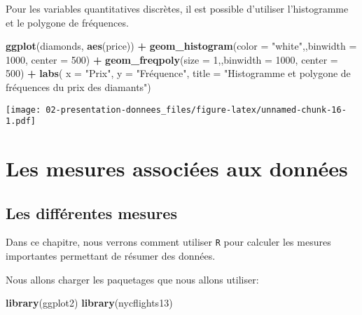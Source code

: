 \documentclass[]{book}
\newenvironment{Shaded}{\begin{snugshade}}{\end{snugshade}}
\newcommand{\KeywordTok}[1]{\textcolor[rgb]{0.13,0.29,0.53}{\textbf{#1}}}
\newcommand{\DataTypeTok}[1]{\textcolor[rgb]{0.13,0.29,0.53}{#1}}
\newcommand{\DecValTok}[1]{\textcolor[rgb]{0.00,0.00,0.81}{#1}}
\newcommand{\StringTok}[1]{\textcolor[rgb]{0.31,0.60,0.02}{#1}}
\newcommand{\OperatorTok}[1]{\textcolor[rgb]{0.81,0.36,0.00}{\textbf{#1}}}
\newcommand{\NormalTok}[1]{#1}
\begin{document}
Pour les variables quantitatives discrètes, il est possible d'utiliser
l'histogramme et le polygone de fréquences.

\begin{Shaded}
\begin{Highlighting}[]
\KeywordTok{ggplot}\NormalTok{(diamonds, }\KeywordTok{aes}\NormalTok{(price)) }\OperatorTok{+}\StringTok{ }
\StringTok{  }\KeywordTok{geom_histogram}\NormalTok{(}\DataTypeTok{color =} \StringTok{"white"}\NormalTok{,,}\DataTypeTok{binwidth =} \DecValTok{1000}\NormalTok{, }\DataTypeTok{center =} \DecValTok{500}\NormalTok{) }\OperatorTok{+}\StringTok{ }
\StringTok{  }\KeywordTok{geom_freqpoly}\NormalTok{(}\DataTypeTok{size =} \DecValTok{1}\NormalTok{,,}\DataTypeTok{binwidth =} \DecValTok{1000}\NormalTok{, }\DataTypeTok{center =} \DecValTok{500}\NormalTok{) }\OperatorTok{+}\StringTok{ }
\StringTok{  }\KeywordTok{labs}\NormalTok{(}
    \DataTypeTok{x =} \StringTok{"Prix"}\NormalTok{, }
    \DataTypeTok{y =} \StringTok{"Fréquence"}\NormalTok{, }
    \DataTypeTok{title =} \StringTok{"Histogramme et polygone de fréquences du prix des diamants"}\NormalTok{)}
\end{Highlighting}
\end{Shaded}

\texttt{[image: 02-presentation-donnees\_files/figure-latex/unnamed-chunk-16-1.pdf]}

\part{Les mesures associées aux
données}\label{part-les-mesures-associees-aux-donnees}

\chapter{Les différentes mesures}\label{les-differentes-mesures}

Dans ce chapitre, nous verrons comment utiliser \texttt{R} pour calculer
les mesures importantes permettant de résumer des données.

Nous allons charger les paquetages que nous allons utiliser:

\begin{Shaded}
\begin{Highlighting}[]
\KeywordTok{library}\NormalTok{(ggplot2)}
\KeywordTok{library}\NormalTok{(nycflights13)}
\end{Highlighting}
\end{Shaded}
\end{document}
